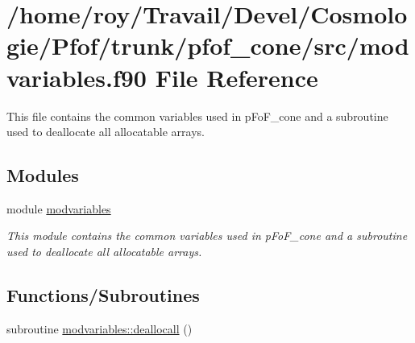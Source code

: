 \hypertarget{pfof__cone_2src_2modvariables_8f90}{}\section{/home/roy/\+Travail/\+Devel/\+Cosmologie/\+Pfof/trunk/pfof\+\_\+cone/src/modvariables.f90 File Reference}
\label{pfof__cone_2src_2modvariables_8f90}


This file contains the common variables used in p\+Fo\+F\+\_\+cone and a subroutine used to deallocate all allocatable arrays.  


\subsection*{Modules}
\begin{DoxyCompactItemize}
\item 
module \hyperlink{namespacemodvariables}{modvariables}
\begin{DoxyCompactList}\small\item\em This module contains the common variables used in p\+Fo\+F\+\_\+cone and a subroutine used to deallocate all allocatable arrays. \end{DoxyCompactList}\end{DoxyCompactItemize}
\subsection*{Functions/\+Subroutines}
\begin{DoxyCompactItemize}
\item 
subroutine \hyperlink{namespacemodvariables_a1b90ef0a0d8979fdfc0a578bbd2f3e17}{modvariables\+::deallocall} ()
\end{DoxyCompactItemize}
